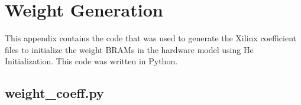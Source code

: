 \chapter{Weight Generation}\label{app:wg}
This appendix contains the code that was used to generate the Xilinx coefficient files to initialize the weight BRAMs in the hardware model using He Initialization. This code was written in Python.

\section{weight\_coeff.py}

\pagebreak